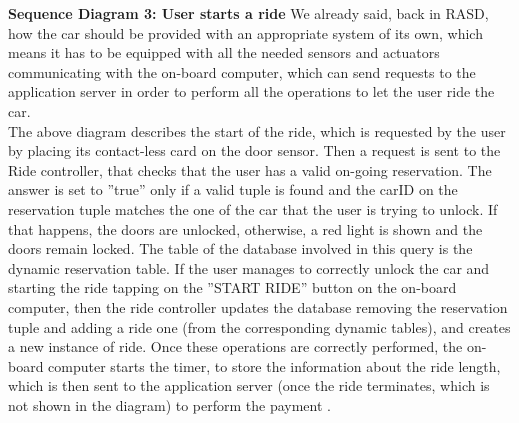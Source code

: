 \documentclass{article}
\begin{document}
\begin{flushleft}
\newpage
\textbf{Sequence Diagram 3: User starts a ride}
\break
We already said, back in RASD, how the car should be provided with an appropriate system of its own, which means it has to be equipped with all the needed sensors and actuators communicating with the on-board computer, which can send requests to the application server in order to perform all the operations to let the user ride the car.\\
The above diagram describes the start of the ride, which is requested by the user by placing its contact-less card on the door sensor. Then a request is sent to the Ride controller, that checks that the user has a valid on-going reservation. The answer is set to ''true'' only if a valid tuple is found and the carID on the reservation tuple matches the one of the car that the user is trying to unlock. If that happens, the doors are unlocked, otherwise, a red light is shown and the doors remain locked. The table of the database involved in this query is the dynamic reservation table. 
If the user manages to correctly unlock the car and starting the ride tapping on the ''START RIDE'' button on the on-board computer, then the ride controller updates the database removing the reservation tuple and adding a ride one (from the corresponding dynamic tables), and creates a new instance of ride. Once these operations are correctly performed, the on-board computer starts the timer, to store the information about the ride length, which is then sent to the application server (once the ride terminates, which is not shown in the diagram) to perform the payment .


\end{flushleft}
\end{document}
